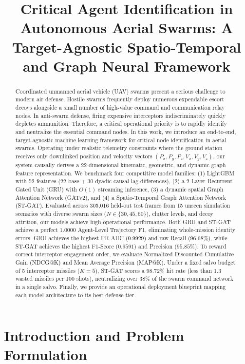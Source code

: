 \documentclass[9pt]{ieeeconf}
\title{Critical Agent Identification in Autonomous Aerial Swarms: A Target-Agnostic Spatio-Temporal and Graph Neural Framework}
\begin{document}
\maketitle

\begin{abstract}
Coordinated unmanned aerial vehicle (UAV) swarms present a serious challenge to modern air defense. Hostile swarms frequently deploy numerous expendable escort decoys alongside a small number of high-value command and communication relay nodes. In anti-swarm defense, firing expensive interceptors indiscriminately quickly depletes ammunition. Therefore, a critical operational priority is to rapidly identify and neutralize the essential command nodes. In this work, we introduce an end-to-end, target-agnostic machine learning framework for critical node identification in aerial swarms. Operating under realistic telemetry constraints where the ground station receives only downlinked position and velocity vectors $(P_x, P_y, P_z, V_x, V_y, V_z)$, our system causally derives a 22-dimensional kinematic, geometric, and dynamic graph feature representation. We benchmark four competitive model families: (1) LightGBM with 52 features (22 base + 30 dyadic causal lag differences), (2) a 2-Layer Recurrent Gated Unit (GRU) with $O(1)$ streaming inference, (3) a dynamic spatial Graph Attention Network (GATv2), and (4) a Spatio-Temporal Graph Attention Network (ST-GAT). Evaluated across 305,016 held-out test frames from 15 unseen simulation scenarios with diverse swarm sizes ($N \in \{30, 45, 60\}$), clutter levels, and decoy attrition, our models achieve high operational performance. Both GRU and ST-GAT achieve a perfect $1.0000$ Agent-Level Trajectory F1, eliminating whole-mission identity errors. GRU achieves the highest PR-AUC ($0.9929$) and raw Recall ($96.68\%$), while ST-GAT achieves the highest F1-Score ($0.9591$) and Precision ($95.85\%$). To reward correct interceptor engagement order, we evaluate Normalized Discounted Cumulative Gain (NDCG@K) and Mean Average Precision (MAP@K). Under a fixed salvo budget of 5 interceptor missiles ($K=5$), ST-GAT scores a $98.72\%$ hit rate (less than 1.3 wasted missiles per 100 shots), neutralizing over $38\%$ of the swarm command network in a single salvo. Finally, we provide an operational deployment blueprint mapping each model architecture to its best defense tier.
\end{abstract}

\section{Introduction and Problem Formulation}
\label{sec:intro}
\end{document}
